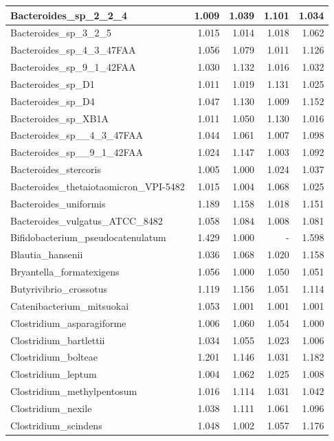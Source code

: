 \documentclass[12pt,a4paper]{article}
\begin{document}
\begin{table}[ht]
\begin{center}
\begin{tabular}{|l*{4}{|r}|}
Bacteroides\_sp\_2\_2\_4 & 1.009 & 1.039 & 1.101 & 1.034 \\ \hline
Bacteroides\_sp\_3\_2\_5 & 1.015 & 1.014 & 1.018 & 1.062 \\ \hline
Bacteroides\_sp\_4\_3\_47FAA & 1.056 & 1.079 & 1.011 & 1.126 \\ \hline
Bacteroides\_sp\_9\_1\_42FAA & 1.030 & 1.132 & 1.016 & 1.032 \\ \hline
Bacteroides\_sp\_D1 & 1.011 & 1.019 & 1.131 & 1.025 \\ \hline
Bacteroides\_sp\_D4 & 1.047 & 1.130 & 1.009 & 1.152 \\ \hline
Bacteroides\_sp\_XB1A & 1.011 & 1.050 & 1.130 & 1.016 \\ \hline
Bacteroides\_sp\_\_4\_3\_47FAA & 1.044 & 1.061 & 1.007 & 1.098 \\ \hline
Bacteroides\_sp\_\_9\_1\_42FAA & 1.024 & 1.147 & 1.003 & 1.092 \\ \hline
Bacteroides\_stercoris & 1.005 & 1.000 & 1.024 & 1.037 \\ \hline
Bacteroides\_thetaiotaomicron\_VPI-5482 & 1.015 & 1.004 & 1.068 & 1.025 \\ \hline
Bacteroides\_uniformis & 1.189 & 1.158 & 1.018 & 1.151 \\ \hline
Bacteroides\_vulgatus\_ATCC\_8482 & 1.058 & 1.084 & 1.008 & 1.081 \\ \hline
Bifidobacterium\_pseudocatenulatum & 1.429 & 1.000 & - & 1.598 \\ \hline
Blautia\_hansenii & 1.036 & 1.068 & 1.020 & 1.158 \\ \hline
Bryantella\_formatexigens & 1.056 & 1.000 & 1.050 & 1.051 \\ \hline
Butyrivibrio\_crossotus & 1.119 & 1.156 & 1.051 & 1.114 \\ \hline
Catenibacterium\_mitsuokai & 1.053 & 1.001 & 1.001 & 1.001 \\ \hline
Clostridium\_asparagiforme & 1.006 & 1.060 & 1.054 & 1.000 \\ \hline
Clostridium\_bartlettii & 1.034 & 1.055 & 1.023 & 1.006 \\ \hline
Clostridium\_bolteae & 1.201 & 1.146 & 1.031 & 1.182 \\ \hline
Clostridium\_leptum & 1.004 & 1.062 & 1.025 & 1.008 \\ \hline
Clostridium\_methylpentosum & 1.016 & 1.114 & 1.031 & 1.042 \\ \hline
Clostridium\_nexile & 1.038 & 1.111 & 1.061 & 1.096 \\ \hline
Clostridium\_scindens & 1.048 & 1.002 & 1.057 & 1.176 \\ \hline

\end{tabular}
\end{center}
\end{table}
\end{document}
